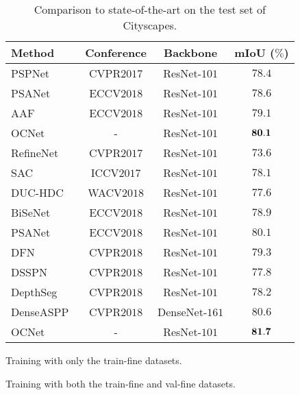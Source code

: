 \documentclass[10pt,twocolumn,letterpaper]{article}
\begin{document}
\begin{table}[ht!]
\centering
\footnotesize
\begin{threeparttable}
\caption{\small{Comparison to state-of-the-art on the test set of Cityscapes.}}
\begin{tabular}{l|c|c|c} \hline
Method & Conference & Backbone & mIoU ($\%$)  \\
\hline
PSPNet~\cite{zhao2017pyramid}\tnote{\textdagger}  &  CVPR$2017$  & ResNet-$101$  &  $78.4$ \\
PSANet~\cite{psanet}\tnote{\textdagger} &  ECCV$2018$  & ResNet-$101$  &  $78.6$ \\
AAF~\cite{aaf2018}\tnote{\textdagger}  &  ECCV$2018$  & ResNet-$101$  &  \underline{$79.1$} \\
OCNet\tnote{\textdagger} & - &  ResNet-$101$ & $\bf{80.1}$ \\  \hline
RefineNet~\cite{lin2017refinenet}\tnote{\textdaggerdbl} &  CVPR$2017$  & ResNet-$101$  &  $73.6$ \\
SAC~\cite{Zhang_2017_ICCV}\tnote{\textdaggerdbl}  &  ICCV$2017$  & ResNet-$101$  &  $78.1$ \\
DUC-HDC~\cite{wang2018understanding}\tnote{\textdaggerdbl} & WACV$2018$ & ResNet-$101$ & $77.6$ \\
BiSeNet~\cite{yu2018bisenet}\tnote{\textdaggerdbl} &  ECCV$2018$  & ResNet-$101$  &  $78.9$ \\
PSANet~\cite{psanet}\tnote{\textdaggerdbl} &  ECCV$2018$  & ResNet-$101$  &  $80.1$ \\
DFN~\cite{Yu_2018_CVPR}\tnote{\textdaggerdbl} &  CVPR$2018$  & ResNet-$101$  &  $79.3$ \\
DSSPN~\cite{Liang_2018_CVPR}\tnote{\textdaggerdbl}  &  CVPR$2018$  & ResNet-$101$  & $77.8$  \\
DepthSeg~\cite{Kong_2018_CVPR}\tnote{\textdaggerdbl} &  CVPR$2018$  & ResNet-$101$  &  $78.2$ \\
DenseASPP~\cite{Yang_2018_CVPR}\tnote{\textdaggerdbl}  &  CVPR$2018$  & DenseNet-$161$  &  \underline{$80.6$} \\
OCNet\tnote{\textdaggerdbl} & - &  ResNet-$101$ & $\bf{81.7}$ \\
\hline
\end{tabular}
\begin{tablenotes}
\item[\textdagger] Training with only the train-fine datasets.
\item[\textdaggerdbl] Training with both the train-fine and val-fine datasets.
\end{tablenotes}
\label{table:ocnet_sota_exp_cityscapes}
\end{threeparttable}
\end{table}
\end{document}
